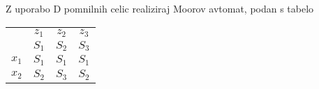 \newpage

\begin{zgled}

Z uporabo D pomnilnih celic realiziraj Moorov avtomat, podan s tabelo

\begin{center}
\begin{tabular}{c|ccc}
& $z_1$ & $z_2$ & $z_3$\\
& $S_1$ & $S_2$ & $S_3$\\
\hline
$x_1$ & $S_1$ & $S_1$ & $S_1$\\
$x_2$ & $S_2$ & $S_3$ & $S_2$\\
\end{tabular}
\end{center}

\end{zgled}

